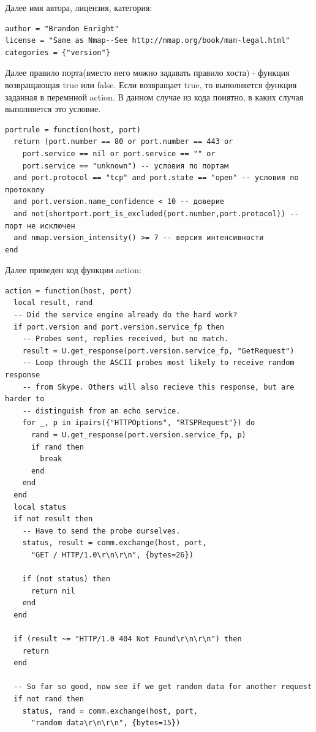 \documentclass[11pt, a4paper]{article}		%
\begin{document}
\begin{itemize}
Далее имя автора, лицензия, категория:

\begin{verbatim}
author = "Brandon Enright"
license = "Same as Nmap--See http://nmap.org/book/man-legal.html"
categories = {"version"}
\end{verbatim}

Далее правило порта(вместо него можно задавать правило хоста) - функция возвращающая true или false. Если возвращает true, то выполняется функция заданная в перемнной action. В данном случае из кода понятно, в каких случая выполняется это условие.
 
\begin{verbatim}
portrule = function(host, port)
  return (port.number == 80 or port.number == 443 or
    port.service == nil or port.service == "" or
    port.service == "unknown") -- условия по портам
  and port.protocol == "tcp" and port.state == "open" -- условия по протоколу
  and port.version.name_confidence < 10 -- доверие
  and not(shortport.port_is_excluded(port.number,port.protocol)) -- порт не исключен
  and nmap.version_intensity() >= 7 -- версия интенсивности
end
\end{verbatim}

Далее приведен код функции action:

\begin{verbatim}
action = function(host, port)
  local result, rand
  -- Did the service engine already do the hard work?
  if port.version and port.version.service_fp then
    -- Probes sent, replies received, but no match.
    result = U.get_response(port.version.service_fp, "GetRequest")
    -- Loop through the ASCII probes most likely to receive random response
    -- from Skype. Others will also recieve this response, but are harder to
    -- distinguish from an echo service.
    for _, p in ipairs({"HTTPOptions", "RTSPRequest"}) do
      rand = U.get_response(port.version.service_fp, p)
      if rand then
        break
      end
    end
  end
  local status
  if not result then
    -- Have to send the probe ourselves.
    status, result = comm.exchange(host, port,
      "GET / HTTP/1.0\r\n\r\n", {bytes=26})

    if (not status) then
      return nil
    end
  end

  if (result ~= "HTTP/1.0 404 Not Found\r\n\r\n") then
    return
  end

  -- So far so good, now see if we get random data for another request
  if not rand then
    status, rand = comm.exchange(host, port,
      "random data\r\n\r\n", {bytes=15})


\end{verbatim}
\end{itemize}
\end{document}

